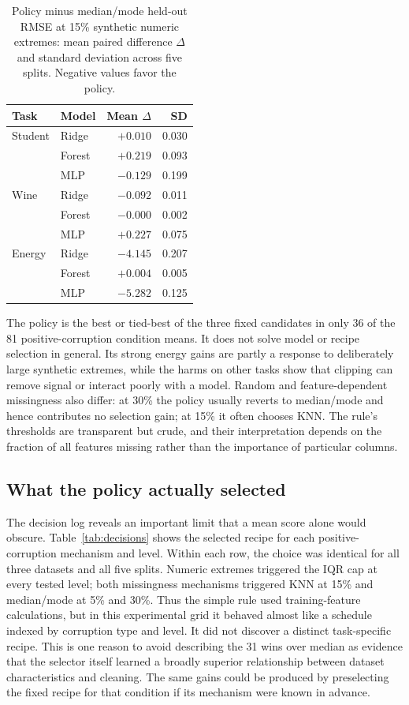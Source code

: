 \documentclass[conference]{IEEEtran}
\begin{document}
\begin{table}[t]\centering\caption{Policy minus median/mode held-out RMSE at 15\% synthetic numeric extremes: mean paired difference $\Delta$ and standard deviation across five splits. Negative values favor the policy.}\label{tab:extreme}\footnotesize
\begin{tabular}{llrr}\toprule
Task & Model & Mean $\Delta$ & SD\\\midrule
Student & Ridge & $+0.010$ & 0.030\\
 & Forest & $+0.219$ & 0.093\\
 & MLP & $-0.129$ & 0.199\\
Wine & Ridge & $-0.092$ & 0.011\\
 & Forest & $-0.000$ & 0.002\\
 & MLP & $+0.227$ & 0.075\\
Energy & Ridge & $-4.145$ & 0.207\\
 & Forest & $+0.004$ & 0.005\\
 & MLP & $-5.282$ & 0.125\\\bottomrule
\end{tabular}
\end{table}

The policy is the best or tied-best of the three fixed candidates in only 36 of the 81 positive-corruption condition means. It does not solve model or recipe selection in general. Its strong energy gains are partly a response to deliberately large synthetic extremes, while the harms on other tasks show that clipping can remove signal or interact poorly with a model. Random and feature-dependent missingness also differ: at 30\% the policy usually reverts to median/mode and hence contributes no selection gain; at 15\% it often chooses KNN. The rule's thresholds are transparent but crude, and their interpretation depends on the fraction of all features missing rather than the importance of particular columns.

\subsection{What the policy actually selected}
The decision log reveals an important limit that a mean score alone would obscure. Table~\ref{tab:decisions} shows the selected recipe for each positive-corruption mechanism and level. Within each row, the choice was identical for all three datasets and all five splits. Numeric extremes triggered the IQR cap at every tested level; both missingness mechanisms triggered KNN at 15\% and median/mode at 5\% and 30\%. Thus the simple rule used training-feature calculations, but in this experimental grid it behaved almost like a schedule indexed by corruption type and level. It did not discover a distinct task-specific recipe. This is one reason to avoid describing the 31 wins over median as evidence that the selector itself learned a broadly superior relationship between dataset characteristics and cleaning. The same gains could be produced by preselecting the fixed recipe for that condition if its mechanism were known in advance.
\end{document}
